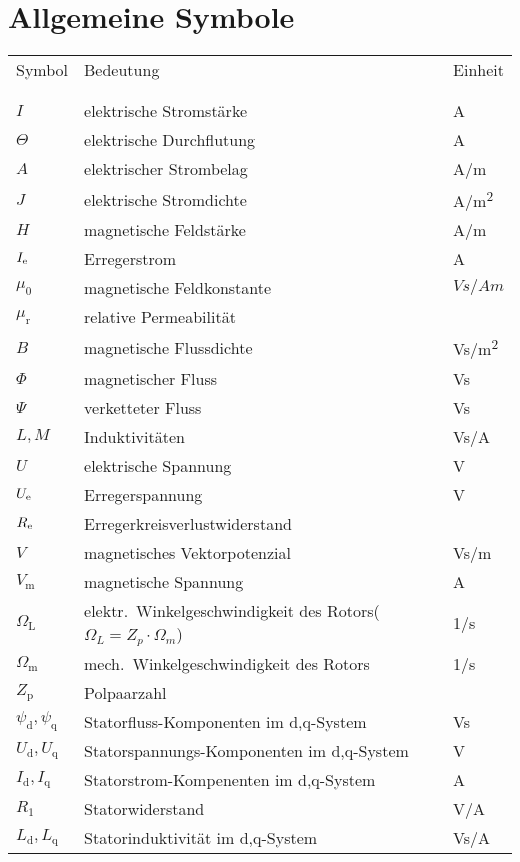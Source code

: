 \section*{Allgemeine Symbole}\label{s.sym.alg}
\begin{flushleft}\begin{tabularx}{\textwidth}{l l X}
Symbol & Bedeutung	& Einheit\\
\\
\hline
\\ 
$I$	& elektrische Stromstärke	&	\si{A} \\
$\Theta$	&	elektrische Durchflutung 	&	\si{A}	\\
$A$			&	elektrischer Strombelag  	&  	\si{A/m}\\ 
$J$			&	elektrische Stromdichte		&	\si{A/m^2} \\	
$H$			&	magnetische Feldstärke		&	\si{A/m}\\
$I_{\mathrm{e}}$	&	Erregerstrom	&	\si{A} \\
$\mu_\mathrm{0}$		&	magnetische Feldkonstante	&	$Vs/Am$\\
$\mu_\mathrm{r}$		&	relative Permeabilität		&	\\
$B$			&	magnetische Flussdichte		&	\si{Vs/m^2}\\
$\Phi$		&	magnetischer Fluss			&	\si{Vs} \\
$\Psi$		&	verketteter Fluss			&	\si{Vs} \\
$L, M$		&	Induktivitäten				&	\si{Vs/A}\\
$U$			&	elektrische Spannung		&	\si{V} \\
$U_{\mathrm{e}}$ & Erregerspannung & \si{V}\\
$R_{\mathrm{e}}$	&	Erregerkreisverlustwiderstand &	\si{\Omega}\\
$V$			&	magnetisches Vektorpotenzial&	\si{Vs/m}\\
$V_\mathrm{m}$		&	magnetische Spannung		&	\si{A} \\
$\Omega_\mathrm{L}$	&	elektr.\ Winkelgeschwindigkeit des Rotors($\Omega_L = Z_p\cdot \Omega_m$) & \si{1/s} \\
$\Omega_\mathrm{m}$	&	mech.\ Winkelgeschwindigkeit des Rotors & \si{1/s} \\
$Z_\mathrm{p}$		&	Polpaarzahl					&	\\
$\psi_\mathrm{d}, \psi_\mathrm{q}$	&	Statorfluss-Komponenten im d,q-System &	\si{Vs} \\
$U_\mathrm{d}, U_\mathrm{q}$	&	Statorspannungs-Komponenten im d,q-System &	\si{V} \\
$I_\mathrm{d}, I_\mathrm{q}$	&	Statorstrom-Kompenenten im d,q-System	&	\si{A} \\
$R_\mathrm{1}$		&	Statorwiderstand			&	\si{V/A} \\
$L_\mathrm{d}, L_\mathrm{q}$	& 	Statorinduktivität im d,q-System & \si{Vs/A}
\end{tabularx}\end{flushleft}
